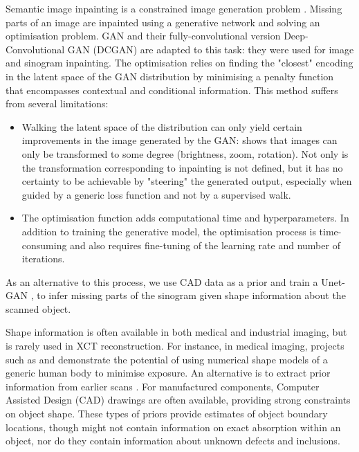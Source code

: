 \documentclass[../main.tex]{subfiles}
\begin{document}
Semantic image inpainting is a constrained image generation problem \cite{pathak2016context}. Missing parts of an image are inpainted using a generative network and solving an optimisation problem. GAN \cite{goodfellow2014generative} and their fully-convolutional version Deep-Convolutional GAN (DCGAN) \cite{radford2015unsupervised} are adapted to this task: they were used for image \cite{yeh2016semantic} and sinogram \cite{yoo2019sinogram} inpainting. The optimisation relies on finding the "closest" encoding in the latent space of the GAN distribution by minimising a penalty function that encompasses contextual and conditional information. This method suffers from several limitations:
\begin{itemize}
	\item Walking the latent space of the distribution can only yield certain improvements in the image generated by the GAN: \cite{jahanian2019steerability} shows that images can only be transformed to some degree (brightness, zoom, rotation). Not only is the transformation corresponding to inpainting is not defined, but it has no certainty to be achievable by "steering" the generated output, especially when guided by a generic loss function and not by a supervised walk.
	\item The optimisation function adds computational time and hyperparameters. In addition to training the generative model, the optimisation process is time-consuming and also requires fine-tuning of the learning rate and number of iterations. 
\end{itemize}
As an alternative to this process, we use CAD data as a prior and train a Unet-GAN \cite{ronneberger2015u}, \cite{isola2017image} to infer missing parts of the sinogram given shape information about the scanned object.

Shape information is often available in both medical and industrial imaging, but is rarely used in XCT reconstruction. For instance, in medical imaging, projects such as \cite{ackerman1998visible} and \cite{xu2007boundary} demonstrate the potential of using numerical shape models of a generic human body to minimise \xr exposure. An alternative is to extract prior information from earlier scans \cite{huang2013iterative, abbas2013super}. For manufactured components, Computer Assisted Design (CAD) drawings are often available, providing strong constraints on object shape. These types of priors provide estimates of object boundary locations, though might not contain information on exact \xr absorption within an object, nor do they contain information about unknown defects and inclusions. 
\end{document}

